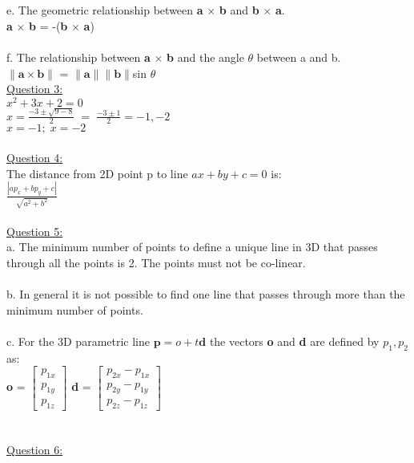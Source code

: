\documentclass[12pt]{article}\usepackage{amsmath}
\begin{document}
\\\\
e. The geometric relationship between \textbf{a} $\times$ \textbf{b} and \textbf{b} $\times$ \textbf{a}.\\
\textbf{a} $\times$ \textbf{b} = -(\textbf{b} $\times$ \textbf{a})
\\\\
f. The relationship between \textbf{a} $\times$ \textbf{b} and the angle $\theta$ between a and b.\\
 $\|\textbf{a} \times \textbf{b}\|$ = $\|\textbf{a}\|\|\textbf{b}\|$sin $\theta$
  \pagebreak
 \\
 \underline{Question 3:}\\
 $x^2 +3x +2 = 0$\\
 $x = \frac{-3 \pm \sqrt{9-8}}{2} \;=\; \frac{-3 \pm 1}{2} = -1, -2$\\
$ x = -1 ; \; x = -2$\\
\\
\underline{Question 4:}\\
 The distance from 2D point p to line $ax + by +c = 0$ is:\\
$\frac{| ap_x + bp_y + c |}{\sqrt{a^2 + b^2}}$\\
\\
\underline{Question 5:}\\
a. The minimum number of points to define a unique line in 3D that passes through all the points is 2. The points must not be co-linear.
\\\\
b. In general it is not possible to find one line that passes through more than the minimum number of points.
\\\\
c. For the 3D parametric line $\textbf{p} = o + t\textbf{d}$ the vectors \textbf{o} and \textbf{d} are defined by $p_1, p_2$ as:\\
\textbf{o} = 
$\begin{bmatrix}
p_{1x}\\
p_{1y}\\
p_{1z}
\end{bmatrix}$
\textbf{d} = 
$\begin{bmatrix}
p_{2x} - p_{1x}\\
p_{2y} - p_{1y}\\
p_{2z} - p_{1z}
\end{bmatrix}$
\\
\\\\
\underline{Question 6:}\\
\end{document}
